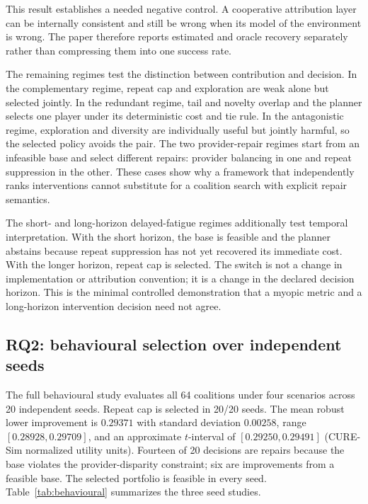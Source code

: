 \documentclass[pdflatex,sn-mathphys-num]{sn-jnl}
\theoremstyle{thmstyleone}
\theoremstyle{thmstyletwo}
\theoremstyle{thmstylethree}
\begin{document}
This result establishes a needed negative control. A cooperative attribution layer can be internally consistent and still be wrong when its model of the environment is wrong. The paper therefore reports estimated and oracle recovery separately rather than compressing them into one success rate.

The remaining regimes test the distinction between contribution and decision. In the complementary regime, repeat cap and exploration are weak alone but selected jointly. In the redundant regime, tail and novelty overlap and the planner selects one player under its deterministic cost and tie rule. In the antagonistic regime, exploration and diversity are individually useful but jointly harmful, so the selected policy avoids the pair. The two provider-repair regimes start from an infeasible base and select different repairs: provider balancing in one and repeat suppression in the other. These cases show why a framework that independently ranks interventions cannot substitute for a coalition search with explicit repair semantics.

The short- and long-horizon delayed-fatigue regimes additionally test temporal interpretation. With the short horizon, the base is feasible and the planner abstains because repeat suppression has not yet recovered its immediate cost. With the longer horizon, repeat cap is selected. The switch is not a change in implementation or attribution convention; it is a change in the declared decision horizon. This is the minimal controlled demonstration that a myopic metric and a long-horizon intervention decision need not agree.

\subsection{RQ2: behavioural selection over independent seeds}\label{sec:rq2}

The full behavioural study evaluates all 64 coalitions under four scenarios across 20 independent seeds. Repeat cap is selected in 20/20 seeds. The mean robust lower improvement is $0.29371$ with standard deviation $0.00258$, range $[0.28928,0.29709]$, and an approximate $t$-interval of $[0.29250,0.29491]$ (CURE-Sim normalized utility units). Fourteen of 20 decisions are repairs because the base violates the provider-disparity constraint; six are improvements from a feasible base. The selected portfolio is feasible in every seed. Table~\ref{tab:behavioural} summarizes the three seed studies.
\end{document}
